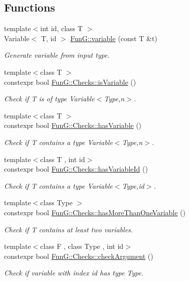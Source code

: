 \subsection*{Functions}
\begin{DoxyCompactItemize}
\item 
{\footnotesize template$<$int id, class T $>$ }\\Variable$<$ T, id $>$ \hyperlink{namespaceFunG_a1c474456411f028e14eab67ff6eebe0c}{Fun\+G\+::variable} (const T \&t)
\begin{DoxyCompactList}\small\item\em Generate variable from input type. \end{DoxyCompactList}\item 
{\footnotesize template$<$class T $>$ }\\constexpr bool \hyperlink{namespaceFunG_1_1Checks_ac2a1a8aedf54c42cb6d47b3b64bbc761}{Fun\+G\+::\+Checks\+::is\+Variable} ()
\begin{DoxyCompactList}\small\item\em Check if T is of type Variable$<$\+Type,n$>$. \end{DoxyCompactList}\item 
{\footnotesize template$<$class T $>$ }\\constexpr bool \hyperlink{namespaceFunG_1_1Checks_a6d289274975a662346a1b5adf0d31f37}{Fun\+G\+::\+Checks\+::has\+Variable} ()
\begin{DoxyCompactList}\small\item\em Check if T contains a type Variable$<$\+Type,n$>$. \end{DoxyCompactList}\item 
{\footnotesize template$<$class T , int id$>$ }\\constexpr bool \hyperlink{namespaceFunG_1_1Checks_a0d42132679e0563893cc6c1809dc9a55}{Fun\+G\+::\+Checks\+::has\+Variable\+Id} ()
\begin{DoxyCompactList}\small\item\em Check if T contains a type Variable$<$\+Type,id$>$. \end{DoxyCompactList}\item 
{\footnotesize template$<$class Type $>$ }\\constexpr bool \hyperlink{namespaceFunG_1_1Checks_a5ff379f125d36c212332fd51012195d5}{Fun\+G\+::\+Checks\+::has\+More\+Than\+One\+Variable} ()
\begin{DoxyCompactList}\small\item\em Check if T contains at least two variables. \end{DoxyCompactList}\item 
{\footnotesize template$<$class F , class Type , int id$>$ }\\constexpr bool \hyperlink{namespaceFunG_1_1Checks_a31790e5d021a40ac34b7469323c658f9}{Fun\+G\+::\+Checks\+::check\+Argument} ()
\begin{DoxyCompactList}\small\item\em Check if variable with index id has type Type. \end{DoxyCompactList}\end{DoxyCompactItemize}
